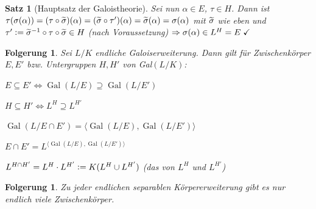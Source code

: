 \documentclass[a4paper,10pt,german]{scrbook}
\theoremstyle{saetze}
\newtheorem{Satz}{Satz}
\theoremstyle{definitionen}
\newtheorem{Folg}[Def]{Folgerung}
\begin{document}
\begin{Satz}[Hauptsatz der Galoistheorie]
{Sei nun $\alpha \in E$, $\tau \in H$. Dann ist $\tau(\sigma(\alpha))
= (\tau \circ \widetilde{\sigma})(\alpha) =
(\widetilde{\sigma}\circ\tau')(\alpha)=\widetilde{\sigma}(\alpha) = \sigma(\alpha) $ mit $\widetilde{\sigma}$ wie eben und
$\tau' \mathrel{\mathop:}= \widetilde{\sigma}^{-1}\circ \tau \circ \widetilde{\sigma} \in H $
(nach Voraussetzung) $\Rightarrow
\sigma(\alpha) \in L^H  = E\; \checkmark$}
\end{Satz}

\begin{Folg}
Sei $L/K$ endliche Galoiserweiterung. Dann
gilt für Zwischenkörper $E,E'$ bzw. Untergruppen $H,H'$ von
Gal$(L/K)$: \begin{enum}
\item $E \subseteq E' \iff \operatorname{Gal}(L/E) \supseteq \operatorname{Gal}(L/E')$

      $H \subseteq H' \iff L^H \supseteq L^{H'}$

\item $\operatorname{Gal}(L/E \cap E') = \langle \operatorname{Gal}(L/E), \operatorname{Gal}(L/E')\rangle$

      $E\cap E' = L^{\langle \operatorname{Gal}(L/E), \operatorname{Gal}(L/E')\rangle}$

      $L^{H\cap H'} = L^H \cdot L^{H'} \mathrel{\mathop:}= K(L^H \cup L^{H'})$ (das  von $L^H$ und $L^{H'}$)

\end{enum}
\end{Folg}

\begin{Folg}
Zu jeder endlichen separablen
Körpererweiterung gibt es nur endlich viele Zwischenkörper.

\end{Folg}
\end{document}
